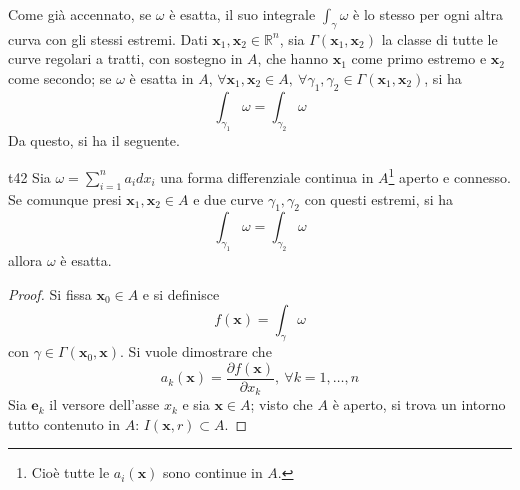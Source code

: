 \documentclass[11pt, a4paper]{scrartcl}
\theoremstyle{definition}
\numberwithin{esempio}{section}
\theoremstyle{definition}
\numberwithin{obs}{section}
\numberwithin{nota}{section}
\numberwithin{equation}{subsection}
\begin{document}
Come gi\`a accennato, se $\omega$ \`e esatta, il suo integrale $\int_{\gamma} \omega$ \`e lo stesso per ogni altra curva con gli stessi estremi. 
Dati $\mathbf{x} _1, \mathbf{x} _2 \in \mathbb{R}^n$, sia $\Gamma(\mathbf{x} _1, \mathbf{x} _2)$ la classe di tutte le curve regolari a tratti, con sostegno in $A$, che hanno $\mathbf{x} _1$ come primo estremo e $\mathbf{x} _2$ come secondo; se $\omega$ \`e esatta in $A$, $\forall \mathbf{x} _1, \mathbf{x} _2 \in A , \ \forall \gamma_1, \gamma_2 \in \Gamma(\mathbf{x} _1, \mathbf{x} _2)$, si ha
\[
\int_{\gamma_1} \omega = \int_{\gamma_2} \omega
\] 
Da questo, si ha il seguente.
\begin{teorema}
	{}{t42}
	Sia $\omega = \sum_{i=1}^{n} a_i dx_i$ una forma differenziale continua in $A$\footnote{Cio\`e tutte le $a_i(\mathbf{x} )$ sono continue in $A$.} aperto e connesso. 
	Se comunque presi $\mathbf{x} _1,\mathbf{x} _2 \in A$ e due curve $\gamma_1, \gamma_2$ con questi estremi, si ha 
	\[
	\int_{\gamma_1} \omega = \int_{\gamma_2} \omega
	\] 
	allora $\omega$ \`e esatta.
	\begin{proof}
		Si fissa $\mathbf{x} _0 \in A$ e si definisce 
		\[
		f(\mathbf{x} ) = \int_{\gamma} \omega
		\] 
		con $\gamma \in \Gamma(\mathbf{x} _0 ,\mathbf{x} )$.
		Si vuole dimostrare che
		\[
		a_k(\mathbf{x} ) = \frac{\partial f(\mathbf{x} )}{\partial x_k} , \  \forall k = 1,\ldots,n
		\] 
		Sia $\mathbf{e} _k$ il versore dell'asse $x_k$ e sia $\mathbf{x} \in A$; visto che $A$ \`e aperto, si trova un intorno tutto contenuto in $A$: $I(\mathbf{x} ,r)\subset A$.
		

\end{proof}
\end{teorema}
\end{document}
